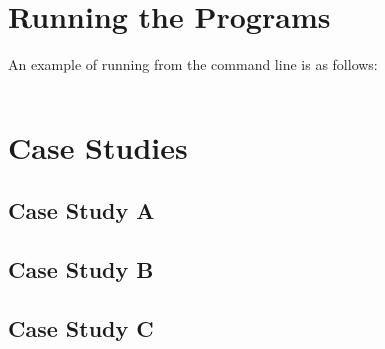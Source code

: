 \documentclass{l4proj}
\begin{document}
\begin{appendices}
\chapter{Running the Programs}
An example of running from the command line is as follows:
\begin{verbatim}
\end{verbatim}

\chapter{Case Studies}
\section{Case Study A}

\section{Case Study B}

\section{Case Study C}


\end{appendices}




\end{document}
